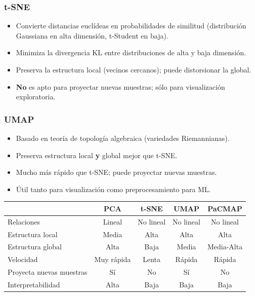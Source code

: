 \documentclass[12pt, a4paper]{article}
\begin{document}
\subsubsection{t-SNE}
\begin{itemize}
	\item Convierte distancias euclídeas en probabilidades de similitud (distribución Gaussiana en alta dimensión, t-Student en baja).
	\item Minimiza la divergencia KL entre distribuciones de alta y baja dimensión.
	\item Preserva la estructura local (vecinos cercanos); puede distorsionar la global.
	\item \textbf{No} es apto para proyectar nuevas muestras; sólo para visualización exploratoria.
\end{itemize}

\subsubsection{UMAP}
\begin{itemize}
	\item Basado en teoría de topología algebraica (variedades Riemannianas).
	\item Preserva estructura local \textbf{y} global mejor que t-SNE.
	\item Mucho más rápido que t-SNE; puede proyectar nuevas muestras.
	\item Útil tanto para visualización como preprocesamiento para ML.
\end{itemize}

\begin{center}
	\begin{tabular}{lcccc}
		\toprule
		                         & \textbf{PCA} & \textbf{t-SNE} & \textbf{UMAP} & \textbf{PaCMAP} \\
		\midrule
		Relaciones               & Lineal       & No lineal      & No lineal     & No lineal       \\
		Estructura local         & Media        & Alta           & Alta          & Alta            \\
		Estructura global        & Alta         & Baja           & Media         & Media-Alta      \\
		Velocidad                & Muy rápida   & Lenta          & Rápida        & Rápida          \\
		Proyecta nuevas muestras & Sí           & No             & Sí            & No              \\
		Interpretabilidad        & Alta         & Baja           & Baja          & Baja            \\
		\bottomrule
	\end{tabular}
\end{center}
\end{document}
